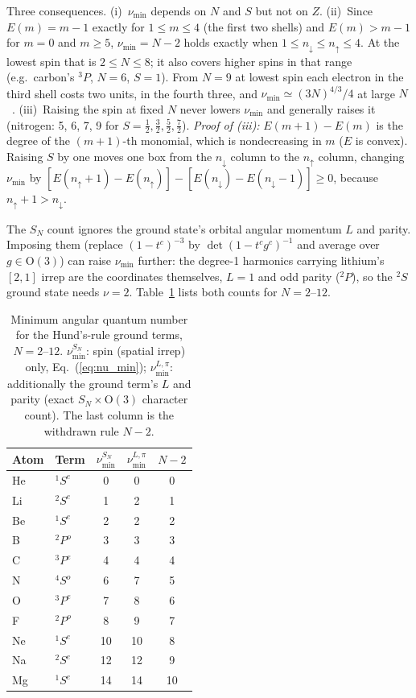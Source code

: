 \documentclass[aps,prl,twocolumn,superscriptaddress,longbibliography]{revtex4-2}
\begin{document}
Three consequences.  (i)~$\nu_{\min}$ depends on $N$ and $S$ but not
on $Z$.  (ii)~Since $E(m) = m-1$ exactly for $1 \le m \le 4$ (the first
two shells) and $E(m) > m-1$ for $m = 0$ and $m \ge 5$, $\nu_{\min} =
N-2$ holds exactly when $1 \le n_\downarrow \le n_\uparrow \le 4$.  At
the lowest spin that is $2 \le N \le 8$; it also covers higher spins
in that range (e.g.\ carbon's ${}^3P$, $N = 6$, $S = 1$).  From $N = 9$
at lowest spin each electron in the third shell costs two units, in
the fourth three, and $\nu_{\min} \simeq (3N)^{4/3}/4$ at large
$N$~\cite{Rittenhouse2006}.  (iii)~Raising the spin at fixed $N$ never
lowers $\nu_{\min}$ and generally raises it (nitrogen: 5, 6, 7, 9 for
$S = \tfrac12, \tfrac32, \tfrac52, \tfrac72$).  \textit{Proof of
(iii):} $E(m+1) - E(m)$ is the degree of the $(m+1)$-th monomial, which
is nondecreasing in $m$ ($E$ is convex).  Raising $S$ by one moves one
box from the $n_\downarrow$ column to the $n_\uparrow$ column, changing
$\nu_{\min}$ by $[E(n_\uparrow + 1) - E(n_\uparrow)] -
[E(n_\downarrow) - E(n_\downarrow - 1)] \ge 0$, because $n_\uparrow + 1
> n_\downarrow$.

The $S_N$ count ignores the ground state's orbital angular momentum
$L$ and parity.  Imposing them (replace $(1-t^c)^{-3}$ by
$\det(1 - t^c g^c)^{-1}$ and average over $g \in \mathrm{O}(3)$) can
raise $\nu_{\min}$ further: the degree-1 harmonics carrying lithium's
$[2,1]$ irrep are the coordinates themselves, $L = 1$ and odd parity
(${}^2P$), so the ${}^2S$ ground state needs $\nu = 2$.
Table~\ref{tab:nu_verified} lists both counts for $N = 2$--$12$.

\begin{table}[h]
\centering
\caption{Minimum angular quantum number for the Hund's-rule ground
terms, $N = 2$--$12$.  $\nu_{\min}^{S_N}$: spin (spatial irrep) only,
Eq.~(\ref{eq:nu_min}); $\nu_{\min}^{L,\pi}$: additionally the ground
term's $L$ and parity (exact $S_N \times \mathrm{O}(3)$ character
count).  The last column is the withdrawn rule $N-2$.}
\label{tab:nu_verified}
\begin{tabular}{llccc}
\toprule
Atom & Term & $\nu_{\min}^{S_N}$ & $\nu_{\min}^{L,\pi}$ & $N-2$ \\
\midrule
He & ${}^1S^e$ &  0 &  0 &  0 \\
Li & ${}^2S^e$ &  1 &  2 &  1 \\
Be & ${}^1S^e$ &  2 &  2 &  2 \\
B  & ${}^2P^o$ &  3 &  3 &  3 \\
C  & ${}^3P^e$ &  4 &  4 &  4 \\
N  & ${}^4S^o$ &  6 &  7 &  5 \\
O  & ${}^3P^e$ &  7 &  8 &  6 \\
F  & ${}^2P^o$ &  8 &  9 &  7 \\
Ne & ${}^1S^e$ & 10 & 10 &  8 \\
Na & ${}^2S^e$ & 12 & 12 &  9 \\
Mg & ${}^1S^e$ & 14 & 14 & 10 \\
\bottomrule
\end{tabular}
\end{table}
\end{document}
